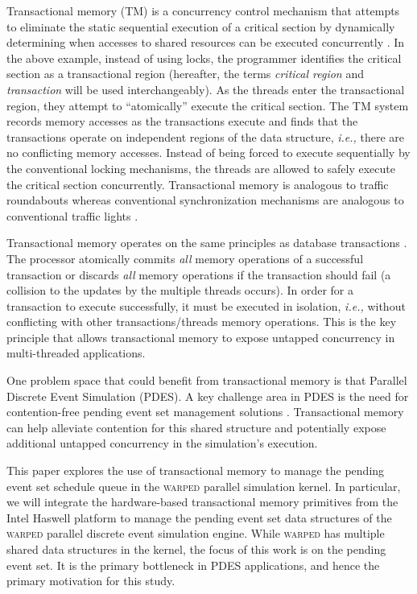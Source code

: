 \documentclass{sig-alternate}
\begin{document}
Transactional memory (TM) is a concurrency control mechanism that attempts to eliminate
the static sequential execution of a critical section by dynamically determining when
accesses to shared resources can be executed concurrently \cite{sle_rajwar}.  In the
above example, instead of using locks, the programmer identifies the critical section
as a transactional region (hereafter, the terms \emph{critical region} and
\emph{transaction} will be used interchangeably).  As the threads enter the transactional
region, they attempt to ``atomically'' execute the critical section.  The TM system
records memory accesses as the transactions execute and finds that the transactions
operate on independent regions of the data structure, \emph{i.e.,} there are no
conflicting memory accesses.  Instead of being forced to execute sequentially by the
conventional locking mechanisms, the threads are allowed to safely execute the critical
section concurrently.  Transactional memory is analogous to traffic roundabouts whereas
conventional synchronization mechanisms are analogous to conventional traffic lights
\cite{neuling_vid}.

Transactional memory operates on the same principles as database transactions
\cite{tm_2nd}.  The processor atomically commits \emph{all} memory operations of a
successful transaction or discards \emph{all} memory operations if the transaction should
fail (a collision to the updates by the multiple threads occurs).  In order for a
transaction to execute successfully, it must be executed in isolation, \emph{i.e.,}
without conflicting with other transactions/threads memory operations.  This is the key
principle that allows transactional memory to expose untapped concurrency in
multi-threaded applications.

One problem space that could benefit from transactional memory is that Parallel Discrete
Event Simulation (PDES).  A key challenge area in PDES is the need for contention-free
pending event set management solutions \cite{dickman}.  Transactional memory can help
alleviate contention for this shared structure and potentially expose additional untapped
concurrency in the simulation's execution.

This paper explores the use of transactional memory to manage the pending event set
schedule queue in the \textsc{warped} parallel simulation kernel.  In particular, we will
integrate the hardware-based transactional memory primitives from the Intel Haswell
platform to manage the pending event set data structures of the \textsc{warped} parallel
discrete event simulation engine.  While \textsc{warped} has multiple shared data
structures in the kernel, the focus of this work is on the pending event set.  It is the
primary bottleneck in PDES applications, and hence the primary motivation for this study.
\end{document}
